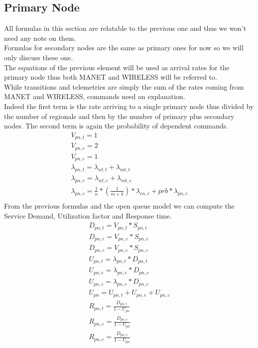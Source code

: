 \documentclass[11pt]{article}
\begin{document}
\subsection{Primary Node}
All formulas in this section are relatable to the previous one and thus we won't need any note on them.\\
Formulas for secondary nodes are the same as primary ones for now so we will only discuss these one.\\
The equations of the previous element will be used as arrival rates for the primary node thus both MANET and WIRELESS will be referred to.\\
While transitions and telemetries are simply the sum of the rates coming from MANET and WIRELESS, commands need an explanation.\\
Indeed the first term is the rate arriving to a single primary node thus divided by the number of regionals and then by the number of primary plus secondary nodes. The second term is again the probability of dependent commands.
\begin{equation}
    \begin{array}{l}
        V_{pn, t} = 1 \\
        V_{pn, e} = 2 \\ %
        V_{pn,c} = 1 \\
        \lambda_{pn, t} = \lambda_{wl, t} + \lambda_{mt, t} \\
        \lambda_{pn, e} = \lambda_{wl, e} + \lambda_{mt, e} \\
        \lambda_{pn, c} = \frac{1}{n} * (\frac{1}{m+k}) * \lambda_{cn, c} + prb * \lambda_{pn, e}  \\\
    \end{array}
\end{equation}
From the previous formulas and the open queue model we can compute the Service Demand, Utilization factor and Response time.
\begin{equation}
    \begin{array}{l}
        D_{pn, t} = V_{pn, t} * S_{pn, t} \\
        D_{pn, e} = V_{pn, e} * S_{pn, e} \\
        D_{pn, c} = V_{pn, c} * S_{pn, c} \\
        U_{pn, t} = \lambda_{pn, t} * D_{pn, t} \\
        U_{pn, e} = \lambda_{pn, e} * D_{pn, e} \\
        U_{pn, c} = \lambda_{pn, c} * D_{pn, c} \\
        U_{pn} = U_{pn, t} + U_{pn, e} + U_{pn, c} \\
        R_{pn, t} = \frac{D_{pn, t}}{1 - U_{pn}} \\
        R_{pn, e} = \frac{D_{pn, e}}{1 - U_{pn}} \\
        R_{pn, c} = \frac{D_{pn, c}}{1 - U_{pn}} \\
    \end{array}
\end{equation}
\end{document}

